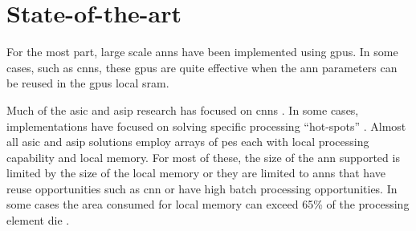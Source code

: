 
\chapter{State-of-the-art}
\label{sec:State of the art}

For the most part, large scale \acp{ann} have been implemented using \acp{gpu}.
In some cases, such as \acp{cnn}, these \acp{gpu} are quite effective when the \ac{ann} parameters can be reused in the \acp{gpu} local \ac{sram}.

Much of the \ac{asic} and \ac{asip} research has focused on \acp{cnn} \cite{azarkhish2017neurostream}\cite{chen201614}\cite{farabet2011neuflow}. 
In some cases, implementations have focused on solving specific processing ``hot-spots'' \cite{chen201614}.
Almost all \ac{asic} and \ac{asip} solutions employ arrays of \acp{pe} each with local processing capability and local memory.
For most of these, the size of the \ac{ann} supported is limited by the size of the local memory or they are limited to \acp{ann} that have reuse opportunities such as \ac{cnn} or have high batch processing opportunities.
In some cases \iffalse, as seen in \fref{fig:Example state-of-the-art die}\fi the area consumed for local memory can exceed 65\% of the 
processing element die \cite{chen2014diannao}\cite{kim2016neurocube}.

